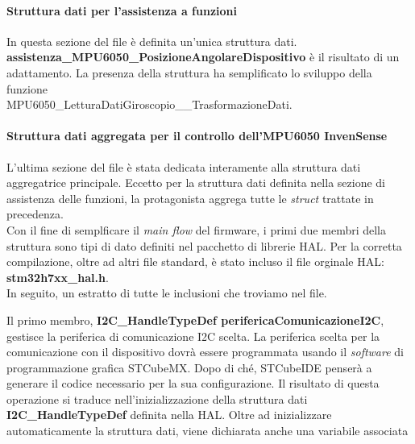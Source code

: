 \documentclass[11pt]{report}
\begin{document}
\paragraph{Struttura dati per l'assistenza a funzioni}
In questa sezione del file è definita un'unica struttura dati.\\
\textbf{assistenza\_MPU6050\_PosizioneAngolareDispositivo} è il risultato di un adattamento. La presenza della struttura ha semplificato lo sviluppo della funzione\\
MPU6050\_LetturaDatiGiroscopio\_\_TrasformazioneDati.

\paragraph{Struttura dati aggregata per il controllo dell'MPU6050 InvenSense}
L'ultima sezione del file è stata dedicata interamente alla struttura dati aggregatrice principale. Eccetto per la struttura dati definita nella sezione di assistenza delle funzioni, la protagonista aggrega tutte le \textit{struct} trattate in precedenza.\\
Con il fine di semplficare il \textit{main flow} del firmware, i primi due membri della struttura sono tipi di dato definiti nel pacchetto di librerie HAL. Per la corretta compilazione, oltre ad altri file standard,  è stato incluso il file orginale HAL: \textbf{stm32h7xx\_hal.h}.\\
In seguito, un estratto di tutte le inclusioni che troviamo nel file.

Il primo membro, \textbf{I2C\_HandleTypeDef perifericaComunicazioneI2C}, gestisce la periferica di comunicazione I2C scelta. La periferica scelta per la comunicazione con il dispositivo dovrà essere programmata usando il \textit{software} di programmazione grafica STCubeMX.
Dopo di ché, STCubeIDE penserà a generare il codice necessario per la sua configurazione. Il risultato di questa operazione si traduce nell'inizializzazione della struttura dati \textbf{I2C\_HandleTypeDef} definita nella HAL. Oltre ad inizializzare automaticamente la struttura dati, viene dichiarata anche una variabile associata
\end{document}
